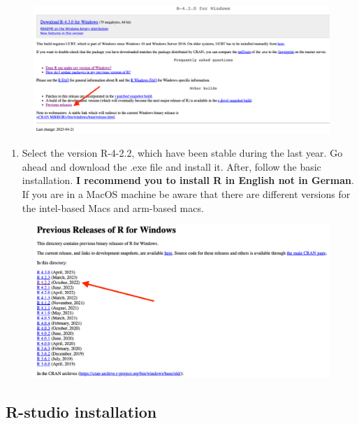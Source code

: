 \documentclass[
  letterpaper,
  DIV=11,
  numbers=noendperiod]{scrartcl}
\providecommand{\tightlist}{%
  \setlength{\itemsep}{0pt}\setlength{\parskip}{0pt}}\usepackage{longtable,booktabs,array}
\begin{document}
\begin{figure}[H]

{\centering \includegraphics[width=6.77083in,height=\textheight]{fig5.png}

}

\end{figure}

\begin{enumerate}
\def\labelenumi{\arabic{enumi}.}
\setcounter{enumi}{5}
\tightlist
\item
  Select the version R-4-2.2, which have been stable during the last
  year. Go ahead and download the .exe file and install it. After,
  follow the basic installation. \textbf{I recommend you to install R in
  English not in German}. If you are in a MacOS machine be aware that
  there are different versions for the intel-based Macs and arm-based
  macs.
\end{enumerate}

\begin{figure}[H]

{\centering \includegraphics[width=6.77083in,height=\textheight]{Fig6.png}

}

\end{figure}

\hypertarget{r-studio-installation}{%
\subsection{R-studio installation}\label{r-studio-installation}}
\end{document}
